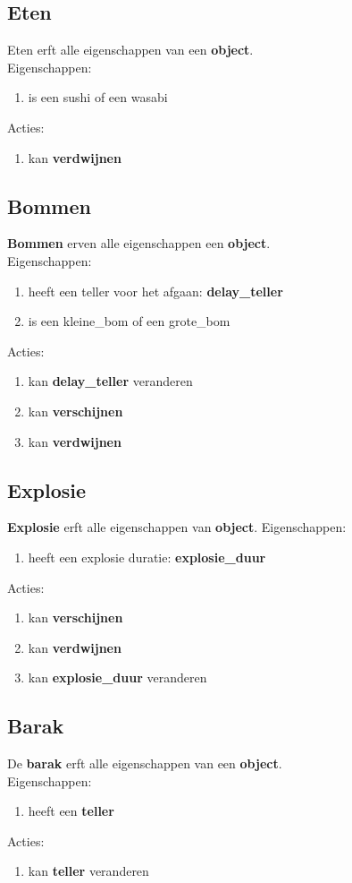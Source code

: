\subsection{Eten}
Eten erft alle eigenschappen van een \textbf{object}. \\
Eigenschappen:
\begin{enumerate}
 \item is een sushi of een wasabi
\end{enumerate}
Acties:
\begin{enumerate}
  \item kan \textbf{verdwijnen}
\end{enumerate}

\subsection{Bommen}
\textbf{Bommen} erven alle eigenschappen een \textbf{object}. \\
Eigenschappen:
\begin{enumerate}
  \item heeft een teller voor het afgaan: \textbf{delay\_teller}
  \item is een kleine\_bom of een grote\_bom
\end{enumerate}

Acties:
\begin{enumerate}
  \item kan \textbf{delay\_teller} veranderen
  \item kan \textbf{verschijnen}
  \item kan \textbf{verdwijnen}
\end{enumerate}

\subsection{Explosie}
\textbf{Explosie} erft alle eigenschappen van \textbf{object}.
Eigenschappen:
\begin{enumerate}
  \item heeft een explosie duratie: \textbf{explosie\_duur}
\end{enumerate}
Acties:
\begin{enumerate}
  \item kan \textbf{verschijnen}
  \item kan \textbf{verdwijnen}
  \item kan \textbf{explosie\_duur} veranderen
\end{enumerate}

\subsection{Barak}
De \textbf{barak} erft alle eigenschappen van een \textbf{object}. \\
Eigenschappen:
\begin{enumerate}
  \item heeft een \textbf{teller}
\end{enumerate}
Acties:
\begin{enumerate}
  \item kan \textbf{teller} veranderen
\end{enumerate}
